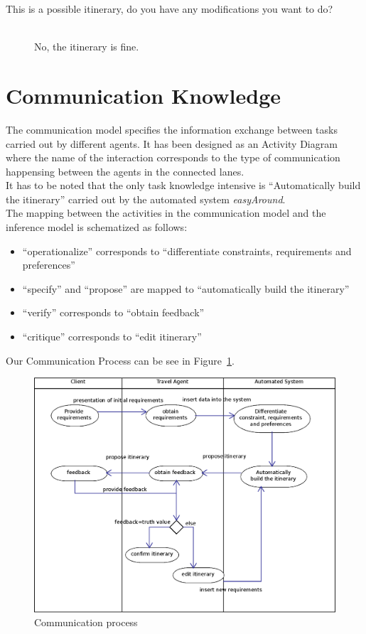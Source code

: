 \documentclass[11pt]{article} %
\begin{document}
\begin{description}
  \item[This is a possible itinerary, do you have any modifications you want to do?] \hfill \\
  No, the itinerary is fine.
\end{description}




\clearpage
\section{Communication Knowledge}
The communication model specifies the information exchange between tasks carried out by different agents. It has been designed as an Activity Diagram where the name of the interaction corresponds to the type of communication happensing between the agents in the connected lanes.\\
It has to be noted that the only task knowledge intensive is ``Automatically build the itinerary'' carried out by the automated system \textit{easyAround}.\\
The mapping between the activities in the communication model and the inference model is schematized as follows:
\begin{itemize}
\item ``operationalize'' corresponds to ``differentiate constraints, requirements and preferences''
\item ``specify'' and ``propose'' are mapped to ``automatically build the itinerary''
\item ``verify'' corresponds to ``obtain feedback''
\item ``critique'' corresponds to ``edit itinerary''
\end{itemize}
Our Communication Process can be see in Figure~\ref{fig:CommunicationDiagram}.

\begin{figure}[h]
\centering
\includegraphics[width=\textwidth]{images/communication.eps}
\caption{Communication process}
\label{fig:CommunicationDiagram}
\end{figure}
\end{document}
